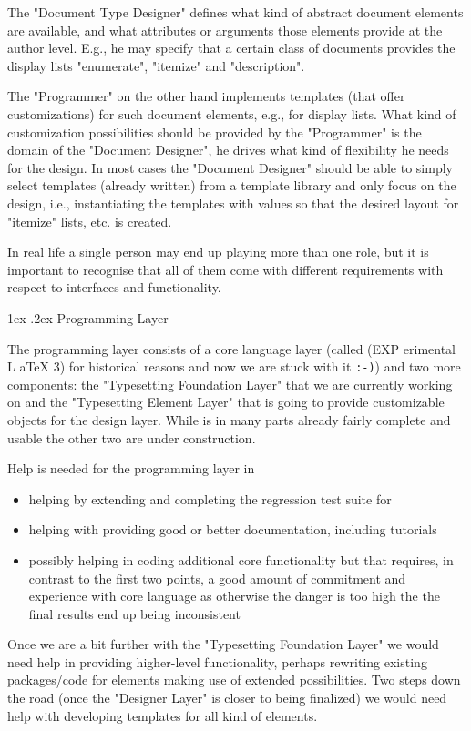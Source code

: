 \documentclass{ltnews}
\makeatletter
\newcommand{\@subheadingfont}{%
   \sffamily\slshape
   \let\LaTeX\cmssLaTeX\let\TeX\cmssTeX
}
\renewcommand{\subsection}{%
   \@startsection
      {subsection}{2}{\z@}{-1.5ex \@plus -1ex \@minus -.2ex}%
      {1ex \@plus.2ex}{\@subheadingfont}%
}
\makeatother
\begin{document}
The "Document Type Designer" defines what kind of abstract document elements are available, and what attributes or arguments those elements provide at the author level. E.g., he may specify that a certain class of documents provides the display lists "enumerate", "itemize" and "description".

The "Programmer" on the other hand implements templates (that offer customizations) for such document elements, e.g., for display lists. What kind of customization possibilities should be provided by the "Programmer" is the domain of the "Document Designer", he drives what kind of flexibility he needs for the design. In most cases the "Document Designer" should be able to simply select templates (already written) from a template library and only focus on the design, i.e., instantiating the templates with values so that the desired layout for "itemize" lists, etc. is created.

In real life a single person may end up playing more than one role, but it is important to recognise that all of them come with different requirements with respect to interfaces and functionality.

\subsection{Programming Layer}

The programming layer consists of a core language layer (called  (EXP erimental L aTeX 3) for historical reasons and now we are stuck with it \texttt{:-)}) and two more components: the "Typesetting Foundation Layer" that we are currently working on and the "Typesetting Element Layer" that is going to provide customizable objects for the design layer. While  is in many parts already fairly complete and usable the other two are under construction.

Help is needed for the programming layer in
\begin{itemize}
\item helping by extending and completing the regression test suite for 
\item helping with providing good or better documentation, including tutorials
\item possibly helping in coding additional core functionality but that requires, in contrast to the first two points, a good amount of commitment and experience with core language as otherwise the danger is too high the the final results end up being inconsistent
\end{itemize}
Once we are a bit further with the "Typesetting Foundation Layer" we would need help in
providing higher-level functionality, perhaps rewriting existing packages/code for elements making use of extended possibilities.
Two steps down the road (once the "Designer Layer" is closer to being finalized) we would need help with developing templates for all kind of elements.
\end{document}
